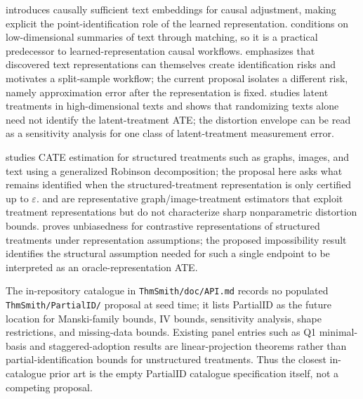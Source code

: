 \documentclass[11pt]{article}
\theoremstyle{definition}
\theoremstyle{plain}
\theoremstyle{remark}
\begin{document}
\citet{VeitchSridharBlei2020} introduces causally sufficient text embeddings for causal adjustment, making explicit the point-identification role of the learned representation. \citet{RobertsStewartNielsen2020} conditions on low-dimensional summaries of text through matching, so it is a practical predecessor to learned-representation causal workflows. \citet{EgamiFongGrimmerRobertsStewart2022} emphasizes that discovered text representations can themselves create identification risks and motivates a split-sample workflow; the current proposal isolates a different risk, namely approximation error after the representation is fixed. \citet{FongGrimmer2023} studies latent treatments in high-dimensional texts and shows that randomizing texts alone need not identify the latent-treatment ATE; the distortion envelope can be read as a sensitivity analysis for one class of latent-treatment measurement error.

\citet{KaddourZhuLiuKusnerSilva2021} studies CATE estimation for structured treatments such as graphs, images, and text using a generalized Robinson decomposition; the proposal here asks what remains identified when the structured-treatment representation is only certified up to \(\varepsilon\). \citet{HaradaKashima2021} and \citet{ThoratKollaPedanekar2024} are representative graph/image-treatment estimators that exploit treatment representations but do not characterize sharp nonparametric distortion bounds. \citet{CorcollAndreuVlontzosORiordanGilliganLee2026} proves unbiasedness for contrastive representations of structured treatments under representation assumptions; the proposed impossibility result identifies the structural assumption needed for such a single endpoint to be interpreted as an oracle-representation ATE.

The in-repository catalogue in \texttt{ThmSmith/doc/API.md} records no populated \texttt{ThmSmith/PartialID/} proposal at seed time; it lists PartialID as the future location for Manski-family bounds, IV bounds, sensitivity analysis, shape restrictions, and missing-data bounds. Existing panel entries such as Q1 minimal-basis and staggered-adoption results are linear-projection theorems rather than partial-identification bounds for unstructured treatments. Thus the closest in-catalogue prior art is the empty PartialID catalogue specification itself, not a competing proposal.
\end{document}

